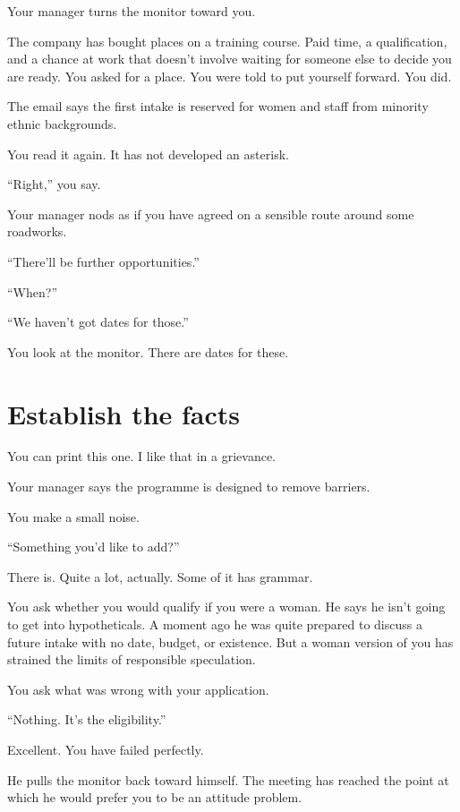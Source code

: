 \documentclass[11pt,oneside]{book}
\begin{document}
Your manager turns the monitor toward you.

The company has bought places on a training course. Paid time, a qualification, and a chance at work that doesn't involve waiting for someone else to decide you are ready. You asked for a place. You were told to put yourself forward. You did.

The email says the first intake is reserved for women and staff from minority ethnic backgrounds.

You read it again. It has not developed an asterisk.

``Right,'' you say.

Your manager nods as if you have agreed on a sensible route around some roadworks.

``There'll be further opportunities.''

``When?''

``We haven't got dates for those.''

You look at the monitor. There are dates for these.

\section*{Establish the facts}

You can print this one. I like that in a grievance.

Your manager says the programme is designed to remove barriers.

You make a small noise.

``Something you'd like to add?''

There is. Quite a lot, actually. Some of it has grammar.

You ask whether you would qualify if you were a woman. He says he isn't going to get into hypotheticals. A moment ago he was quite prepared to discuss a future intake with no date, budget, or existence. But a woman version of you has strained the limits of responsible speculation.

You ask what was wrong with your application.

``Nothing. It's the eligibility.''

Excellent. You have failed perfectly.

He pulls the monitor back toward himself. The meeting has reached the point at which he would prefer you to be an attitude problem.
\end{document}
